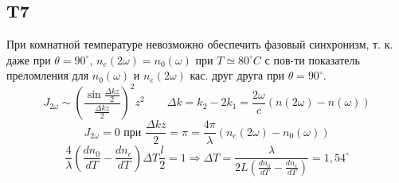 \subsection*{T7}
При комнатной температуре невозможно обеспечить фазовый синхронизм, т. к. даже при $\theta = 90^{\circ}$, $n_e(2\omega) = n_0(\omega)$ при $T \simeq 80^{\circ} C$ с пов-ти показатель преломления для $n_0(\omega)$ и  $n_e(2\omega)$  кас. друг друга при $\theta=90^{\circ}$.
$$J_{2\omega} \sim \left( \frac{\sin \frac{\Delta k z}{2}}{\frac{\Delta k z }{2}} \right)^2 z^2 \qquad \Delta k = k_2 - 2k_1 = \frac{2\omega}{c} (n(2\omega ) -n(\omega))$$
$$J_{2\omega} = 0 \text{ при } \frac{\Delta k z}{2} = \pi = \frac{4\pi}{\lambda} (n_e(2\omega) - n_0(\omega))$$
$$\frac{4}{\lambda} \left( \frac{dn_0}{dT} - \frac{dn_e}{dT} \right) \Delta T\frac{l}{2} = 1 \Rightarrow \Delta T = \frac{\lambda}{2L (\frac{dn_0}{dT} - \frac{dn_e}{dT})} = 1,54^{\circ}$$